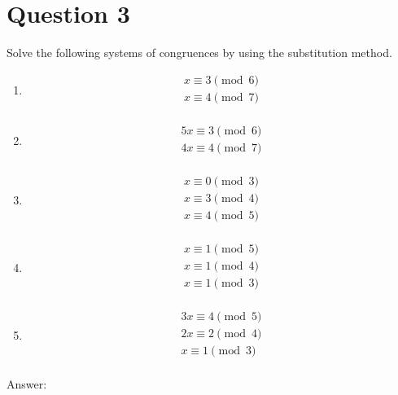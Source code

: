 \documentclass[openany]{report}
\begin{document}
\section{Question 3}
Solve the following systems of congruences by using the substitution method.
\begin{enumerate}[label=(\alph*)]
    \item 
    \begin{align*}
        x \equiv 3 \pmod{6} \\
        x \equiv 4 \pmod{7} \\
    \end{align*}
    \item 
    \begin{align*}
        5x \equiv 3 \pmod{6} \\
        4x \equiv 4 \pmod{7} \\
    \end{align*}
    \item 
    \begin{align*}
        x \equiv 0 \pmod{3} \\
        x \equiv 3 \pmod{4} \\
        x \equiv 4 \pmod{5} \\
    \end{align*}
    \item 
    \begin{align*}
        x \equiv 1 \pmod{5} \\
        x \equiv 1 \pmod{4} \\
        x \equiv 1 \pmod{3} \\
    \end{align*}
    \item 
    \begin{align*}
        3x \equiv 4 \pmod{5} \\
        2x \equiv 2 \pmod{4} \\
        x \equiv 1 \pmod{3} \\
    \end{align*}
\end{enumerate}
\textrm{Answer:}
\end{document}
